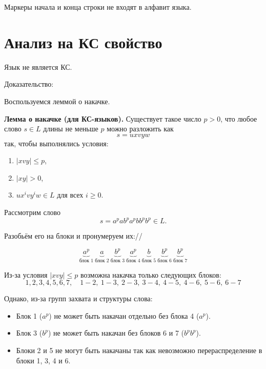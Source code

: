 \documentclass[a4paper,12pt]{article}
\begin{document}
Маркеры начала и конца строки не входят в алфавит языка.


\clearpage 
\section{Анализ на КС свойство}

Язык не является КС.

Доказательство:

Воспользуемся леммой о накачке.

\medskip

\textbf{Лемма о накачке (для КС-языков).}  
Существует такое число $p > 0$, что любое слово $s \in L$ длины не меньше $p$ можно разложить как
\[
s = u x v y w
\]
так, чтобы выполнялись условия:
\begin{enumerate}
    \item $|x v y| \le p$,
    \item $|x y| > 0$,
    \item $u x^i v y^i w \in L$ для всех $i \ge 0$.
\end{enumerate}

\medskip

Рассмотрим слово
\[
s = a^p a b^p a^p b b^p b^p \in L.
\]

Разобьём его на блоки и пронумеруем их://

\[
\underbrace{a^p}_{\text{блок 1}} \ 
\underbrace{a}_{\text{блок 2}} \ 
\underbrace{b^p}_{\text{блок 3}} \ 
\underbrace{a^p}_{\text{блок 4}} \ 
\underbrace{b}_{\text{блок 5}} \ 
\underbrace{b^p}_{\text{блок 6}} \ 
\underbrace{b^p}_{\text{блок 7}}
\]


Из-за условия $|x v y| \le p$ возможна накачка только следующих блоков:
\[
1, 2, 3, 4, 5, 6, 7, \quad 1\!-\!2, \ 1\!-\!3, \ 2\!-\!3, \ 3\!-\!4, \ 4\!-\!5, \ 4\!-\!6, \ 5\!-\!6, \ 6\!-\!7
\]

Однако, из-за групп захвата и структуры слова:
\begin{itemize}
    \item Блок 1 ($a^p$) не может быть накачан отдельно без блока 4 ($a^p$).
    \item Блок 3 ($b^p$) не может быть накачан без блоков 6 и 7 ($b^p b^p$).
    \item Блоки 2 и 5 не могут быть накачаны так как невозможно перераспределение в блоки 1, 3, 4 и 6.
\end{itemize}
\end{document}
